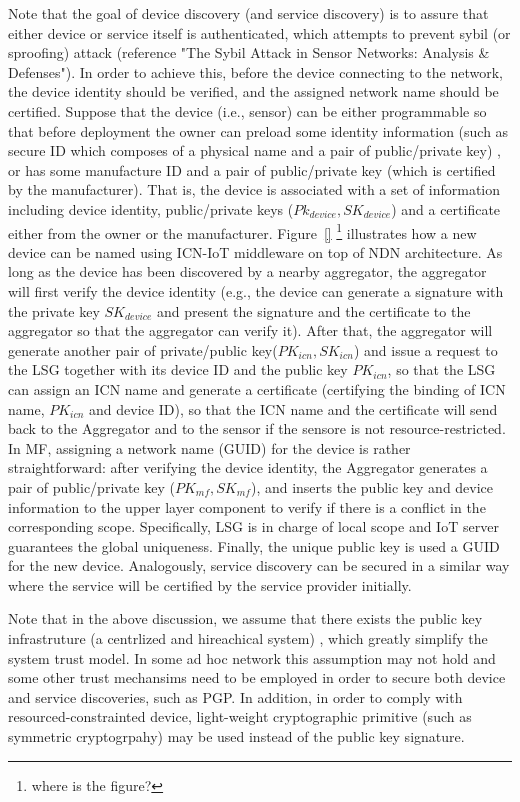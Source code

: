 Note that the goal of device discovery (and service discovery) is to assure that either device or service itself is authenticated, which attempts to prevent sybil (or sproofing) attack  (reference "The Sybil Attack in Sensor Networks: Analysis \& Defenses").  In order to achieve this, before the device connecting to the network, the device identity should be verified, and the assigned network name should be certified.   Suppose that  the device (i.e., sensor) can be either programmable so that before deployment the owner can preload some identity information (such as secure ID which composes of a physical name and a pair of public/private key) , or has some manufacture ID and a pair of public/private key (which is certified by the manufacturer). That is, the device is associated with a set of information including device identity, public/private keys ($Pk_{device}, SK_{device}$) and a certificate either from the owner or the manufacturer.   Figure~\ref{} \footnote{where is the figure?} illustrates how a new device can be named using ICN-IoT middleware on top of NDN architecture.  As long as the device has been discovered by a nearby aggregator, the aggregator will first verify the device identity (e.g., the device can generate a signature with the private key $SK_{device}$ and present the signature and the certificate to the aggregator so that the aggregator can verify it).  After that, the aggregator 
will generate another pair of private/public key($PK_{icn}, SK_{icn}$) and issue a request to the LSG together with its device ID and the public key $PK_{icn}$,  so that the LSG can assign an ICN name and generate a certificate (certifying the binding of  ICN name, $PK_{icn}$ and device ID),  so that the ICN name and the certificate will send back to the Aggregator and to the sensor if the sensore is not resource-restricted.  In MF, assigning a network name (GUID) for the device is rather straightforward: after verifying the device identity, the  Aggregator generates a pair of public/private key ($PK_{mf}, SK_{mf}$), and inserts the public key and device information to the upper layer component to verify if there is a conflict in the corresponding scope. Specifically, LSG is in charge of local scope and IoT server guarantees the global uniqueness. Finally, the unique public key is used a GUID for the new device.  Analogously,  service discovery can be secured  in a similar way where the service will be certified by the service provider initially. 

Note that in the above discussion, we assume that  there exists the public key infrastruture (a centrlized and hireachical system) , which greatly simplify the system trust model. In some ad hoc network this assumption may not hold and some other trust mechansims need to be employed in order to secure both device and service discoveries, such as PGP. In addition, in order to comply with resourced-constrainted device, light-weight cryptographic primitive (such as symmetric cryptogrpahy) may be used instead of the public key signature. 

